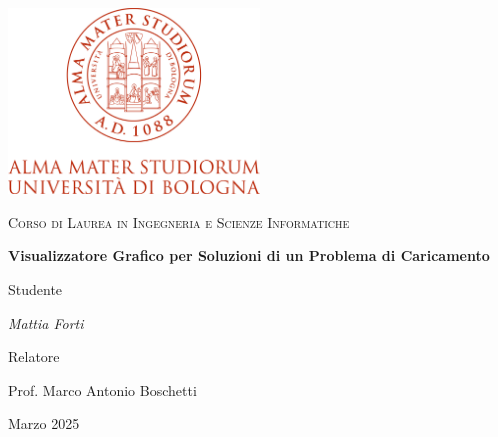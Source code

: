 \documentclass[a4paper,12pt]{report}
\begin{document}
\begin{titlepage}
    \centering
    \includegraphics[width=0.5\textwidth]{img/logo.png}\par\vspace{1cm}
    {\scshape\Large Corso di Laurea in Ingegneria e Scienze Informatiche\par}
    \vspace{1.5cm}
    {\huge\bfseries Visualizzatore Grafico per Soluzioni di un Problema di Caricamento\par}
    \vspace{2cm}
    Studente\par
    {\Large\itshape Mattia Forti\par}
    \vfill
    Relatore\par
    {\Large Prof. Marco Antonio Boschetti\par}
    \vfill
    {\large Marzo 2025\par}
\end{titlepage}
\newpage

\tableofcontents
%
\end{document}

